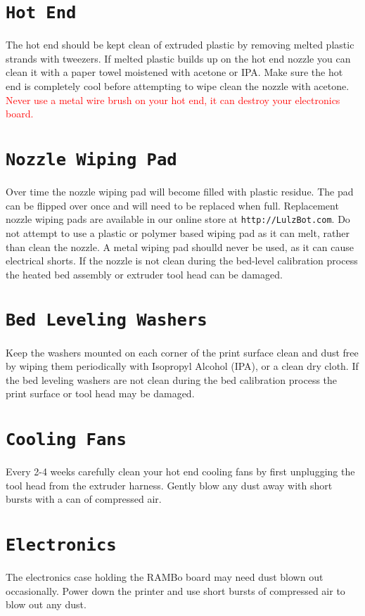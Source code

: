 \section{\texttt{Hot End}}
The hot end should be kept clean of extruded plastic by removing melted plastic strands with tweezers. If melted plastic builds up on the hot end nozzle you can clean it with a paper towel moistened with acetone or IPA. Make sure the hot end is completely cool before attempting to wipe clean the nozzle with acetone. \textcolor{red}{Never use a metal wire brush on your hot end, it can destroy your electronics board.}

\section{\texttt{Nozzle Wiping Pad}}
Over time the nozzle wiping pad will become filled with plastic residue. The pad can be flipped over once and will need to be replaced when full. Replacement nozzle wiping pads are available in our online store at \texttt{http://LulzBot.com}. Do not attempt to use a plastic or polymer based wiping pad as it can melt, rather than clean the nozzle. A metal wiping pad shoulld never be used, as it can cause electrical shorts. If the nozzle is not clean during the bed-level calibration process the heated bed assembly or extruder tool head can be damaged.

\section{\texttt{Bed Leveling Washers}}
Keep the washers mounted on each corner of the print surface clean and dust free by wiping them periodically with Isopropyl Alcohol (IPA), or a clean dry cloth. If the bed leveling washers are not clean during the bed calibration process the print surface or tool head may be damaged.

\section{\texttt{Cooling Fans}}
Every 2-4 weeks carefully clean your hot end cooling fans by first unplugging the tool head from the extruder harness. Gently blow any dust away with short bursts with a can of compressed air. 


\section{\texttt{Electronics}}
The electronics case holding the RAMBo board may need dust blown out occasionally. Power down the printer and use short bursts of compressed air to blow out any dust.

